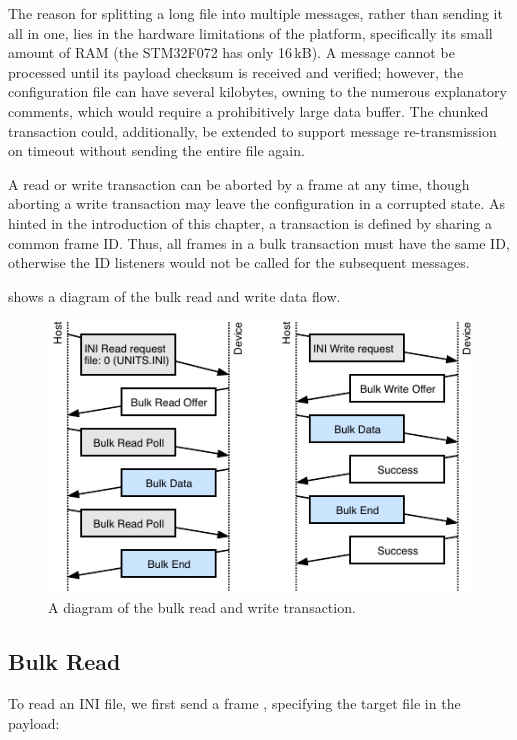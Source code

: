 The reason for splitting a long file into multiple messages, rather than sending it all in one, lies in the hardware limitations of the platform, specifically its small amount of \gls{RAM} (the STM32F072 has only 16\,kB). A message cannot be processed until its payload checksum is received and verified; however, the configuration file can have several kilobytes, owning to the numerous explanatory comments, which would require a prohibitively large data buffer. The chunked transaction could, additionally, be extended to support message re-transmission on timeout without sending the entire file again.

A read or write transaction can be aborted by a frame \CmdBulkAbort at any time, though aborting a write transaction may leave the configuration in a corrupted state. As hinted in the introduction of this chapter, a transaction is defined by sharing a common frame ID. Thus, all frames in a bulk transaction must have the same ID, otherwise the ID listeners would not be called for the subsequent messages.

 shows a diagram of the bulk read and write data flow.

\begin{figure}
	\centering
	\includegraphics[scale=1.5]{img/bulk-read-write.pdf}
	\caption{\label{fig:bulk_rw}A diagram of the bulk read and write transaction.}
\end{figure}

\subsection{Bulk Read}

To read an INI file, we first send a frame \CmdINIRead, specifying the target file in the payload:


